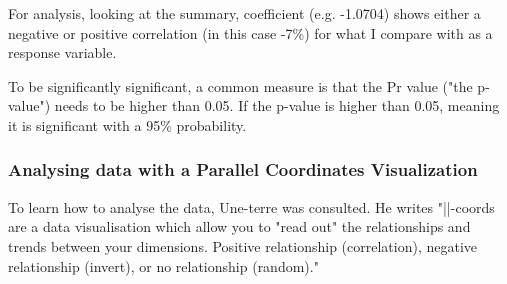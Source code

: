 For analysis, looking at the summary, coefficient (e.g. -1.0704) shows either a negative or positive correlation (in this case -7\%) for what I compare with as a response variable.

To be significantly significant, a common measure is that the Pr value ("the p-value") needs to be higher than 0.05. If the p-value is higher than 0.05, meaning it is significant with a 95\% probability.

\subsubsection{Analysing data with a Parallel Coordinates Visualization}

To learn how to analyse the data, Une-terre \citep{une-terre} was consulted. %
He writes "||-coords are a data visualisation which allow you to "read out" the relationships and trends between your dimensions. Positive relationship (correlation), negative relationship (invert), or no relationship (random)."
